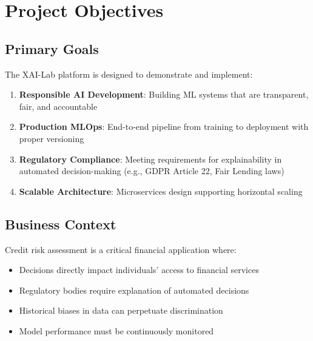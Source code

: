 \documentclass[11pt,a4paper]{article}
\begin{document}
\section{Project Objectives}

\subsection{Primary Goals}

The XAI-Lab platform is designed to demonstrate and implement:

\begin{enumerate}[leftmargin=*]
    \item \textbf{Responsible AI Development}: Building ML systems that are transparent, fair, and accountable
    \item \textbf{Production MLOps}: End-to-end pipeline from training to deployment with proper versioning
    \item \textbf{Regulatory Compliance}: Meeting requirements for explainability in automated decision-making (e.g., GDPR Article 22, Fair Lending laws)
    \item \textbf{Scalable Architecture}: Microservices design supporting horizontal scaling
\end{enumerate}

\subsection{Business Context}

Credit risk assessment is a critical financial application where:
\begin{itemize}
    \item Decisions directly impact individuals' access to financial services
    \item Regulatory bodies require explanation of automated decisions
    \item Historical biases in data can perpetuate discrimination
    \item Model performance must be continuously monitored
\end{itemize}

\end{document}
